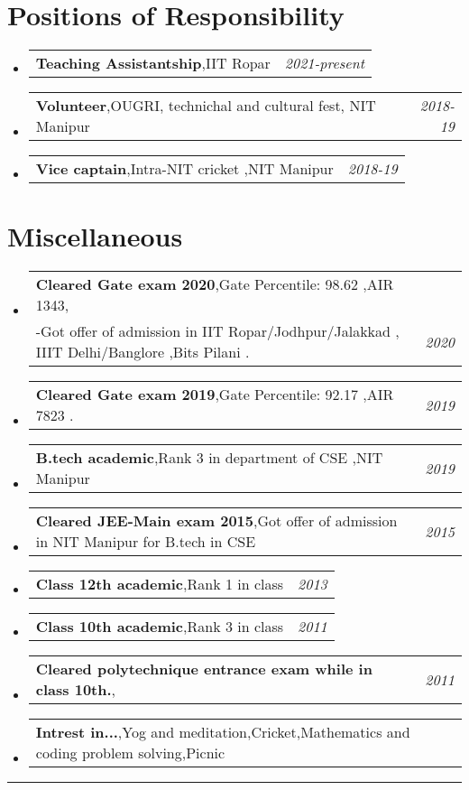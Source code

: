 \documentclass[a4paper,11pt]{article}
\makeatletter
\newcommand{\resumePOR}[3]{
\vspace{0.5mm}\item
    \begin{tabular*}{0.97\textwidth}[t]{l@{\extracolsep{\fill}}r}
        \textbf{#1},\hspace{0.3mm}#2 & \textit{\small{#3}} 
    \end{tabular*}
    \vspace{-2mm}
}
\newcommand{\resumeSubHeadingListStart}{\begin{itemize}[leftmargin=*,labelsep=0mm]}
\newcommand{\resumeSubHeadingListEnd}{\end{itemize}\vspace{2mm}}
\makeatother
\begin{document}
\vspace{-1mm}


\section{\color{blue}\textbf{Positions of Responsibility}}
\vspace{-0.4mm}
\resumeSubHeadingListStart
\resumePOR{Teaching Assistantship} %
    {IIT Ropar} %
    {2021-present} %
\resumePOR{Volunteer} %
    {OUGRI, technichal and cultural fest, NIT Manipur} %
    {2018-19} %
\resumePOR{Vice captain} %
    {Intra-NIT cricket ,NIT Manipur} %
    {2018-19} %
\resumeSubHeadingListEnd
\vspace{-4mm}


\section{\color{blue}\textbf{Miscellaneous}}
\vspace{-0.1mm}
\resumeSubHeadingListStart
\resumePOR{Cleared Gate exam 2020} %
    {Gate Percentile: 98.62 ,AIR 1343, \\
    -Got offer of admission in IIT Ropar/Jodhpur/Jalakkad , IIIT Delhi/Banglore ,Bits Pilani .} %
    {2020} %
\vspace{-0.1mm}
\resumePOR{Cleared Gate exam 2019} %
    {Gate Percentile: 92.17 ,AIR 7823 .} %
    {2019} %
\vspace{-0.1mm}
\resumePOR{B.tech academic} %
    {Rank 3 in department of CSE ,NIT Manipur } %
    {2019} %
\vspace{-0.1mm}
\resumePOR{Cleared JEE-Main exam 2015} %
    {Got offer of admission in NIT Manipur for B.tech in CSE} %
    {2015} %
\vspace{-0.1mm}


\resumePOR{Class 12th academic} %
    {Rank 1  in class} %
    {2013} %
\vspace{-0.1mm}
\resumePOR{Class 10th academic} %
    {Rank 3  in class} %
    {2011} %
\vspace{-0.1mm}
\resumePOR{Cleared polytechnique entrance exam while in class 10th.} %
    {} %
    {2011} %
\vspace{-0.1mm}
\resumePOR{Intrest in...} %
    {Yog and meditation,Cricket,Mathematics and coding problem solving,Picnic} %
    {} %
    
\vspace{-1.2mm}
\resumeSubHeadingListEnd
\hspace*{-5mm}\rule{1.035\textwidth}{0.1mm}


\end{document}
